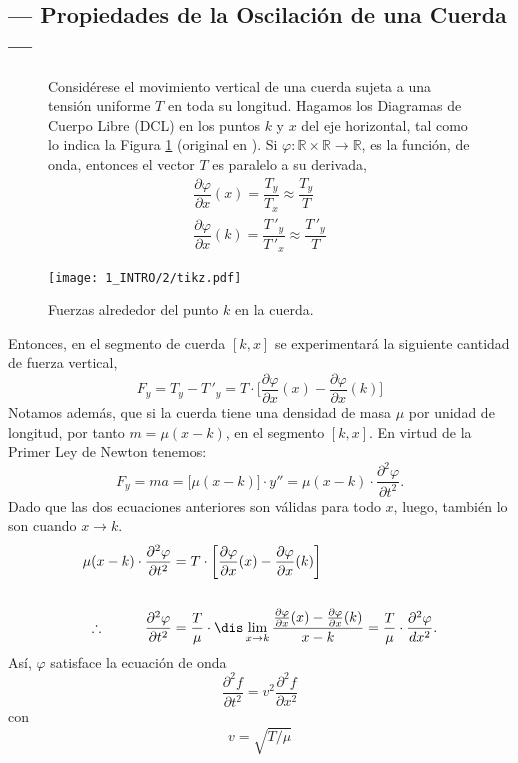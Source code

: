 \documentclass[10pt,a4paper]{article}
\begin{document}
\subsection{--- Propiedades de la Oscilación de una Cuerda ---} %
\label{sub:cuerda}
\begin{figure}[ht]
	\begin{minipage}{0.45\linewidth}
		Considérese el movimiento vertical de una cuerda sujeta a una tensión uniforme \(T\) en toda su longitud.
		Hagamos los Diagramas de Cuerpo Libre (DCL) en los puntos \(k\) y \(x\) del eje horizontal, tal como lo indica la Figura \ref{fig:cuerdita} (original en ).
		Si \(\varphi : \mathds{R} \times \mathds{R} \longrightarrow \mathds{R}\), es la función, de onda, entonces el vector \(T\) es paralelo a su derivada, 
		\[
			\begin{array}{rcl}
				\dfrac{\partial \varphi}{\partial x} (x) = \dfrac{T_y}{T_x} \approx \dfrac{T_y}{T} \\[6mm]
				\dfrac{\partial \varphi}{\partial x} (k) = \dfrac{T\,'_y}{T\,'_x} \approx \dfrac{T\,'_y}{T}
			\end{array}
		\]
	\end{minipage}
	\begin{minipage}{0.55\linewidth}
		\texttt{[image: 1\_INTRO/2/tikz.pdf]}
		\caption{Fuerzas alrededor del punto \(k\) en la cuerda.}
		\label{fig:cuerdita}
	\end{minipage}
\end{figure}%
Entonces, en el segmento de cuerda \([k,x]\) se experimentará la siguiente cantidad de fuerza vertical,
\[
	F_y = T_y-T\,' _y = T \cdot \bigg[\dfrac{\partial \varphi}{\partial x} (x) - \dfrac{\partial \varphi}{\partial x} (k)\bigg]
\]
Notamos además, que si la cuerda tiene una densidad de masa \(\mu\) por unidad de longitud, por tanto \(m= \mu (x-k)\), en el segmento \([k,x]\).
En virtud de la Primer Ley de Newton tenemos:
\[
	F_y = ma = \big[\mu (x-k)\big] \cdot y'' = \mu (x-k) \cdot \dfrac{\partial ^2 \varphi}{\partial t^2}.
\]
Dado que las dos ecuaciones anteriores son válidas para todo \(x\), luego, también lo son cuando \(x \longrightarrow k\).
\begin{align*}
	\mu (x-k) \cdot \dfrac{\partial ^2 \varphi}{\partial t^2} &= T \cdot \bigg[\dfrac{\partial \varphi}{\partial x} (x) - \dfrac{\partial \varphi}{\partial x} (k)\bigg] \\[6mm]
	\therefore \hspace{1cm} \dfrac{\partial ^2 \varphi}{\partial t^2} &= \dfrac{T}{\mu} \cdot \dis\lim_{x\rightarrow k} \dfrac{\frac{\partial \varphi}{\partial x} (x) - \frac{\partial \varphi}{\partial x} (k)}{x-k} = \dfrac{T}{\mu} \cdot \dfrac{\partial ^2 \varphi}{dx^2}.
\end{align*}
Así, \(\varphi\) satisface la ecuación de onda
\begin{equation}
	\dfrac{\partial^2 f}{\partial t^2} = v^2 \dfrac{\partial ^2f}{\partial x^2}
	\label{eq:onda}
\end{equation}
con
\begin{equation}
	v = \sqrt{T/ \mu}
	\label{eq:velocidad}
\end{equation}
\end{document}
